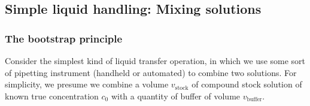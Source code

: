 \documentclass[aps,pre,twocolumn,nofootinbib,superscriptaddress,linenumbers]{revtex4-1}
\begin{document}
%

\subsection*{Simple liquid handling: Mixing solutions}

\subsubsection*{The bootstrap principle}

Consider the simplest kind of liquid transfer operation, in which we use some sort of pipetting instrument (handheld or automated) to combine two solutions.
For simplicity, we presume we combine a volume $v_\mathrm{stock}$ of compound stock solution of known true concentration $c_0$ with a quantity of buffer of volume $v_\mathrm{buffer}$.
\end{document}
